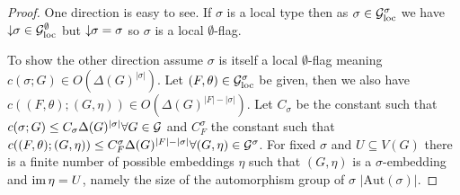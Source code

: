 \begin{proof}
    One direction is easy to see. If $\sigma$ is a local type then as $\sigma\in\mathcal{G}_\mathrm{loc}^\sigma$
    we have ${\downarrow\!\!\sigma}\in\mathcal{G}_\mathrm{loc}^\emptyset$ but ${\downarrow\!\!\sigma}=\sigma$ so
    $\sigma$ is a local $\emptyset$-flag.

    To show the other direction assume $\sigma$ is itself a local $\emptyset$-flag
    meaning $c(\sigma; G) \in O(\Delta(G)^{|\sigma|})$. Let $(F, \theta) \in\mathcal{G}_\mathrm{loc}^\sigma$ be
    given, then we also have $c((F, \theta); (G, \eta)) \in O(\Delta(G)^{|F|-|\sigma|})$.
    Let $C_\sigma$ be the constant such that
    $c(\sigma; G) \leq C_\sigma \Delta(G)^{|\sigma|}\forall G\in\mathcal{G}$ and
    $C_F^\sigma$ the constant such that
    $c((F, \theta); (G, \eta)) \leq C_F^\sigma\Delta(G)^{|F|-|\sigma|}\forall
    (G,\eta)\in\mathcal{G}^\sigma$. For fixed $\sigma$ and $U \subseteq V(G)$ there is
    a finite number of possible embeddings $\eta$ such that $(G,\eta)$ is a
    $\sigma$-embedding and $\operatorname{im}\eta=U$, namely the size of the automorphism group of $\sigma$
    $|\mathrm{Aut}(\sigma)|$.


\end{proof}
